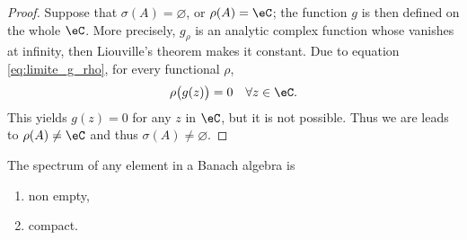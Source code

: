\begin{proof}
	Suppose that $\sigma(A)=\varnothing$, or $\rho(A)=\eC$; the function $g$ is then defined on the whole $\eC$. More precisely, $g_{\rho}$ is an analytic complex function whose vanishes at infinity, then Liouville's theorem makes it constant. Due to equation \eqref{eq:limite_g_rho}, for every functional $\rho$,
	\[
	   \rho\big(g(z)\big)=0\quad\forall z\in\eC.
	\]
	This yields $g(z)=0$ for any $z$ in $\eC$, but it is not possible. Thus we are leads to $\rho(A)\neq\eC$ and thus $\sigma(A)\neq\varnothing$.
\end{proof}

\begin{theorem}
The spectrum of any element in a Banach algebra is
\begin{enumerate}
\item non empty,
\item compact.
\end{enumerate}
\end{theorem}

